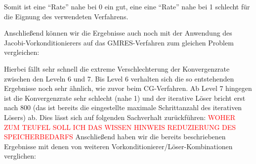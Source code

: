 \documentclass[12pt,a4paper]{scrartcl}
\numberwithin{equation}{section}
\begin{document}
Somit ist eine \enquote{Rate} nahe bei 0 ein gut, eine eine \enquote{Rate} nahe bei 1 schlecht für die Eignung des verwendeten Verfahrens. 

Anschließend können wir die Ergebnisse auch noch mit der Anwendung des Jacobi-Vorkonditionierers auf das GMRES-Verfahren zum gleichen Problem vergleichen:

\begin{figure}[H]
	\centering
\end{figure}

Hierbei fällt sehr schnell die extreme Verschlechterung der Konvergenzrate zwischen den Leveln 6 und 7.
Bis Level 6 verhalten sich die so entstehenden Ergebnisse noch sehr ähnlich, wie zuvor beim CG-Verfahren.
Ab Level 7 hingegen ist die Konvergenzrate sehr schlecht (nahe 1) und der iterative Löser bricht erst nach 800 (das ist bereits die eingestellte maximale Schrittanzahl des iterativen Lösers) ab. Dies lässt sich auf folgenden Sachverhalt zurückführen:
\textcolor{red}{WOHER ZUM TEUFEL SOLL ICH DAS WISSEN HINWEIS REDUZIERUNG DES SPEICHERBEDARFS}
\newline
Anschließend haben wir die bereits beschriebenen Ergebnisse mit denen von weiteren Vorkonditionierer/Löser-Kombinationen verglichen:

\begin{figure}[H]
	\centering
\end{figure}
\end{document}
